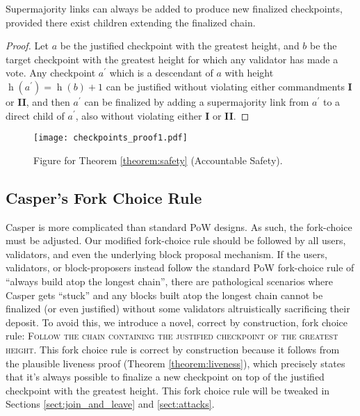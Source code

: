 \documentclass[12pt]{article}
\newcommand{\h}{\operatorname{h}\xspace}
\begin{document}
\begin{theorem}
\label{theorem:liveness}
Supermajority links can always be added to produce new finalized checkpoints, provided there exist children extending the finalized chain.
\begin{proof}
Let $a$ be the justified checkpoint with the greatest height, and $b$ be the target checkpoint with the greatest height for which any validator has made a vote. Any checkpoint $a^\prime$ which is a descendant of $a$ with height $\h(a^\prime) = \h(b) + 1$ can be justified without violating either commandments \textbf{I} or \textbf{II}, and then $a^\prime$ can be finalized by adding a supermajority link from $a^\prime$ to a direct child of $a^\prime$, also without violating either \textbf{I} or \textbf{II}.
\end{proof}


\end{theorem}


\begin{figure}[h!tb]
\centering
   \texttt{[image: checkpoints\_proof1.pdf]}
\caption{Figure for Theorem \ref{theorem:safety} (Accountable Safety).}
\label{fig:proof1}	
\end{figure}



\subsection{Casper's Fork Choice Rule}
\label{sect:forkchoice}

Casper is more complicated than standard PoW designs.  As such, the fork-choice must be adjusted.  Our modified fork-choice rule should be followed by all users, validators, and even the underlying block proposal mechanism.  If the users, validators, or block-proposers instead follow the standard PoW fork-choice rule of ``always build atop the longest chain'', there are pathological scenarios where Casper gets ``stuck'' and any blocks built atop the longest chain cannot be finalized (or even justified) without some validators altruistically sacrificing their deposit.  To avoid this, we introduce a novel, correct by construction, fork choice rule: \textsc{Follow the chain containing the justified checkpoint of the greatest height}.  This fork choice rule is correct by construction because it follows from the plausible liveness proof (Theorem \ref{theorem:liveness}), which precisely states that it's always possible to finalize a new checkpoint on top of the justified checkpoint with the greatest height.  This fork choice rule will be tweaked in Sections \ref{sect:join_and_leave} and \ref{sect:attacks}.
\end{document}
